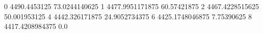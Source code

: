 0 4490.4453125 73.0244140625
1 4477.9951171875 60.57421875
2 4467.4228515625 50.001953125
4 4442.326171875 24.9052734375
6 4425.1748046875 7.75390625
8 4417.4208984375 0.0
